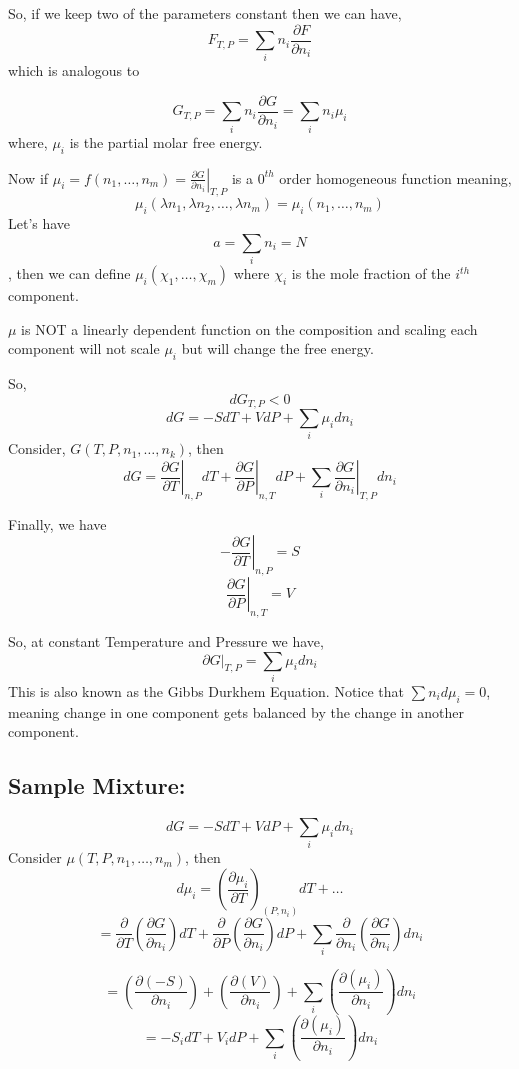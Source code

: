 \documentclass{article}
\theoremstyle{definition}
\begin{document}
\begin{mdframed}[style=MyFrame, frametitle={Definition of Homogeneous Functions}]
\end{mdframed}

So, if we keep two of the parameters constant then we can have,
\[
F_{T,P} = \sum_i n_i \frac{\partial F}{\partial n_i}
\]
which is analogous to 

\[
G_{T,P} = \sum_i n_i \frac{\partial G}{\partial n_i} = \sum_i n_i \mu_i
\]
where, $\mu_i $ is the partial molar free energy.

Now if $\mu_i = f(n_1, \ldots, n_m) = \left. \frac{\partial G}{\partial n_i} \right|_{T,P}$ is a $0^{th}$ order homogeneous function meaning,
\[
\mu_i(\lambda n_1, \lambda n_2, \ldots, \lambda n_m) = \mu_i (n_1, \ldots, n_m)
\]
Let's have $$a = \sum_i n_i = N$$, then we can define $\mu_i (\chi_1, \ldots, \chi_m)$ where $\chi_i$ is the mole fraction of the $i^{th}$ component.

$\mu$ is NOT a linearly dependent function on the composition and scaling each component will not scale $\mu_i$ but will change the free energy.

So,
\[
dG_{T,P} <0
\]
\[
dG = -SdT +VdP + \sum_i \mu_i dn_i
\]
Consider, $G(T,P, n_1, \ldots, n_k)$, then 
\[
dG = \left .\frac{\partial G}{\partial T }\right|_{n,P} dT + \left .\frac{\partial G}{\partial P }\right|_{n,T} dP + \sum_i\left .\frac{\partial G}{\partial n_i }\right|_{T,P} dn_i 
\]


Finally, we have 
\[
\boxed{- \left .\frac{\partial G}{\partial T }\right|_{n,P} = S}
\]
\[
\boxed{ \left .\frac{\partial G}{\partial P }\right|_{n,T} = V}
\]

So, at constant Temperature and Pressure we have, 
\[
\boxed{ \left .{\partial G}\right|_{T,P} = \sum_i \mu_i dn_i}
\]
 This is also known as the Gibbs Durkhem Equation.
 Notice that $\sum n_i d\mu_i =0$, meaning change in one component gets balanced by the change in another component.


\subsection{Sample Mixture:}
\[
dG = -SdT +VdP + \sum_i \mu_i dn_i
\]
Consider $\mu(T,P, n_1, \ldots, n_m)$, then
\[
d\mu_i = \left ( \frac{\partial \mu_i}{\partial T} \right)_{(P,n_i)} dT + \ldots
\]
\[
= \frac{\partial}{\partial T}\left ( \frac{\partial G}{\partial n_i} \right) dT + \frac{\partial}{\partial P}\left ( \frac{\partial G}{\partial n_i} \right) dP + \sum_i \frac{\partial}{\partial n_i}\left ( \frac{\partial G}{\partial n_i} \right) dn_i
\]

\[
= \left ( \frac{\partial (-S)}{\partial n_i} \right) + \left ( \frac{\partial (V)}{\partial n_i} \right) + \sum_i \left ( \frac{\partial (\mu_i)}{\partial n_i} \right) dn_i 
\]
\[
= -S_idT + V_idP + \sum_i \left ( \frac{\partial (\mu_i)}{\partial n_i} \right) dn_i 
\]
\end{document}
